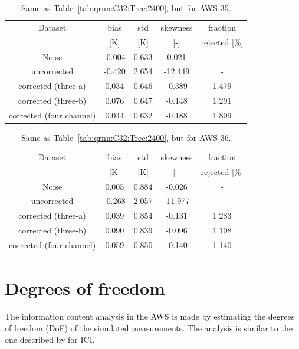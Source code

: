 \documentclass[12pt]{article}
\begin{document}
\begin{table}[!p]
	\centering
	\begin{tabular}[b]{c|c|c|c|c}
		Dataset  		  &   bias &   std &   skewness & fraction  \\
		&   [K]  &   [K] & [-] & rejected [\%]\\
		\hline
Noise                      & -0.004 & 0.633 &              0.021 &      - \\
uncorrected                & -0.420 & 2.654 &            -12.449 &      - \\
corrected (three-a) 	   &  0.034 & 0.646 &             -0.389 &      1.479 \\
corrected (three-b) 	   &  0.076 & 0.647 &             -0.148 &      1.291 \\
corrected (four channel)   &  0.044 & 0.632 &             -0.188 &      1.809 \\
		\hline
	\end{tabular}
	\caption{ Same as Table~\ref{tab:qrnn:C32:Trec:2400}, but for AWS-35. }
	\label{tab:qrnn:C35:Trec:2400}
\end{table}

\begin{table}[!p]
	\centering
	\begin{tabular}[b]{c|c|c|c|c}
		Dataset  		  &   bias &   std &   skewness & fraction  \\
		&   [K]  &   [K] & [-] & rejected [\%]\\
		\hline
Noise                      &  0.005 & 0.884 &             -0.026 &      - \\
uncorrected                & -0.268 & 2.057 &            -11.977 &      - \\
corrected (three-a) &  0.039 & 0.854 &             -0.131 &      1.283 \\
corrected (three-b) &  0.090 & 0.839 &             -0.096 &      1.108 \\
corrected (four channel)   &  0.059 & 0.850 &             -0.140 &      1.140 \\
		\hline
	\end{tabular}
	\caption{ Same as Table~\ref{tab:qrnn:C32:Trec:2400}, but for AWS-36.  }
	\label{tab:qrnn:C36:Trec:2400}
\end{table}

\section{Degrees of freedom}
%
The information content analysis in the AWS is made by estimating the degrees of freedom (DoF) of the simulated measurements. The analysis is similar to the one described by  \citet{eriksson:towar:20} for ICI.
\end{document}
